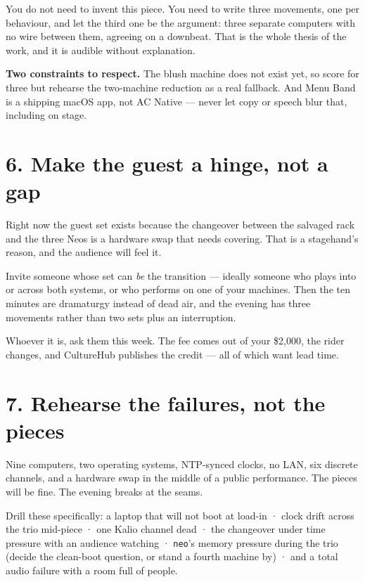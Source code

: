\documentclass[11pt]{article}
\begin{document}
You do not need to invent this piece. You need to write three movements, one per
behaviour, and let the third one be the argument: three separate computers with
no wire between them, agreeing on a downbeat. That is the whole thesis of the
work, and it is audible without explanation.

\textbf{Two constraints to respect.} The blush machine does not exist yet, so
score for three but rehearse the two-machine reduction as a real fallback. And
Menu Band is a shipping macOS app, not AC Native — never let copy or speech blur
that, including on stage.

\section{6. Make the guest a hinge, not a gap}

Right now the guest set exists because the changeover between the salvaged rack
and the three Neos is a hardware swap that needs covering. That is a stagehand's
reason, and the audience will feel it.

Invite someone whose set can \emph{be} the transition — ideally someone who plays
into or across both systems, or who performs on one of your machines. Then the
ten minutes are dramaturgy instead of dead air, and the evening has three
movements rather than two sets plus an interruption.

Whoever it is, ask them this week. The fee comes out of your \$2,000, the rider
changes, and CultureHub publishes the credit — all of which want lead time.

\section{7. Rehearse the failures, not the pieces}

Nine computers, two operating systems, NTP-synced clocks, no LAN, six discrete
channels, and a hardware swap in the middle of a public performance. The pieces
will be fine. The evening breaks at the seams.

Drill these specifically: a laptop that will not boot at load-in · clock drift
across the trio mid-piece · one Kalio channel dead · the changeover under time
pressure with an audience watching · \texttt{neo}'s memory pressure during the
trio (decide the clean-boot question, or stand a fourth machine by) · and a total
audio failure with a room full of people.
\end{document}
